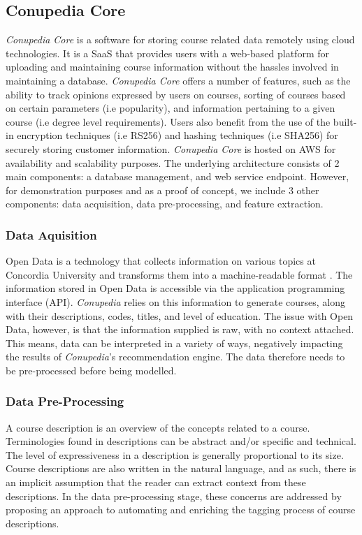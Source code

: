 \documentclass[conference]{IEEEtran}
\begin{document}
    \subsection{Conupedia Core}
        \textit{Conupedia Core} is a software for storing course related data remotely using cloud technologies.
        It is a SaaS that provides users with a web-based platform for uploading and maintaining course information without the hassles involved in maintaining a database.
        \textit{Conupedia Core} offers a number of features, such as the ability to track opinions expressed by users on courses, sorting of courses based on certain parameters (i.e popularity), and information pertaining to a given course (i.e degree level requirements).
        Users also benefit from the use of the built-in encryption techniques (i.e RS256) and hashing techniques (i.e SHA256) for securely storing customer information.
        \textit{Conupedia Core} is hosted on AWS for availability and scalability purposes.
        The underlying architecture consists of 2 main components: a database management, and web service endpoint.
        However, for demonstration purposes and as a proof of concept, we include 3 other components: data acquisition, data pre-processing, and feature extraction. \\
        
        \subsubsection{Data Aquisition}
        
           Open Data is a technology that collects information on various topics at Concordia University and transforms them into a machine-readable format \cite{b2}. 
            The information stored in Open Data is accessible via the application programming interface (API). 
            \textit{Conupedia} relies on this information to generate courses, along with their descriptions, codes, titles, and level of education. 
            The issue with Open Data, however, is that the information supplied is raw, with no context attached. 
            This means, data can be interpreted in a variety of ways, negatively impacting the results of \textit{Conupedia}'s recommendation engine.
            The data therefore needs to be pre-processed before being modelled.\\
            
            \subsubsection{Data Pre-Processing}
            A course description is an overview of the concepts related to a course.
            Terminologies found in descriptions can be abstract and/or specific and technical.
            The level of expressiveness in a description is generally proportional to its size.
            Course descriptions are also written in the natural language, and as such, there is an implicit assumption that the reader can extract context from these descriptions.
            In the data pre-processing stage, these concerns are addressed by proposing an approach to automating and enriching the tagging process of course descriptions.
\end{document}
